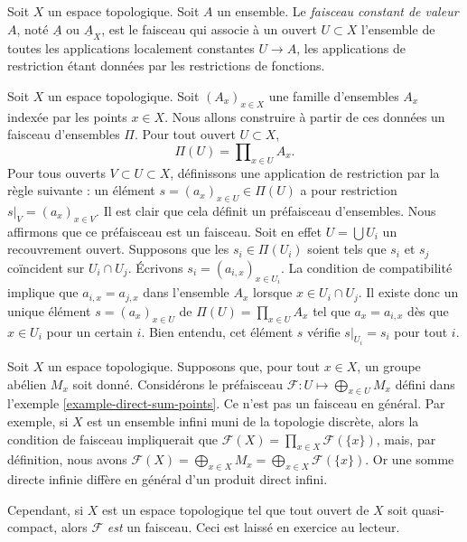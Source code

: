 \begin{definition}
\label{definition-constant-sheaf}
Soit $X$ un espace topologique. Soit $A$ un ensemble.
Le {\it faisceau constant de valeur $A$}, noté $\underline{A}$ ou
$\underline{A}_X$, est le faisceau qui associe à un ouvert $U \subset X$
l'ensemble de toutes les applications localement constantes $U \to A$, les applications
de restriction étant données par les restrictions de fonctions.
\end{definition}

\begin{example}
\label{example-sheaf-product-pointwise}
Soit $X$ un espace topologique. Soit $(A_x)_{x \in X}$
une famille d'ensembles $A_x$ indexée par les points $x \in X$. Nous
allons construire à partir de ces données un faisceau d'ensembles $\Pi$.
Pour tout ouvert $U \subset X$,
$$
\Pi(U) = \prod\nolimits_{x \in U} A_x.
$$
Pour tous ouverts $V \subset U \subset X$, définissons
une application de restriction par la règle suivante : un élément
$s = (a_x)_{x\in U} \in \Pi(U)$ a pour restriction
$s|_V = (a_x)_{x \in V}$. Il est clair que cela
définit un préfaisceau d'ensembles. Nous affirmons que ce préfaisceau est un faisceau.
Soit en effet $U = \bigcup U_i$ un recouvrement ouvert.
Supposons que les $s_i \in \Pi(U_i)$
soient tels que $s_i$ et $s_j$ coïncident sur $U_i \cap U_j$. Écrivons
$s_i = (a_{i, x})_{x\in U_i}$. La condition de compatibilité implique que
$a_{i, x} = a_{j, x}$ dans l'ensemble $A_x$ lorsque $x \in U_i \cap U_j$.
Il existe donc un unique élément $s = (a_x)_{x\in U}$
de $\Pi(U) = \prod_{x\in U} A_x$ tel que
$a_x = a_{i, x}$ dès que $x \in U_i$ pour un certain $i$. Bien entendu, cet
élément $s$ vérifie $s|_{U_i} = s_i$ pour tout $i$.
\end{example}

\begin{example}
\label{example-direct-sum-points-not-sheaf}
Soit $X$ un espace topologique.
Supposons que, pour tout $x\in X$, un groupe abélien $M_x$ soit donné.
Considérons le préfaisceau $\mathcal{F} : U \mapsto \bigoplus_{x \in U} M_x$
défini dans l'exemple \ref{example-direct-sum-points}. Ce
n'est pas un faisceau en général. Par exemple, si $X$ est un ensemble infini
muni de la topologie discrète, alors la condition de faisceau
impliquerait que $\mathcal{F}(X) = \prod_{x\in X} \mathcal{F}(\{x\})$,
mais, par définition, nous avons $\mathcal{F}(X)
= \bigoplus_{x \in X} M_x = \bigoplus_{x \in X} \mathcal{F}(\{x\})$.
Or une somme directe infinie diffère en général d'un
produit direct infini.

\medskip\noindent
Cependant, si $X$ est un espace topologique tel que tout ouvert
de $X$ soit quasi-compact, alors $\mathcal{F}$ {\it est} un faisceau.
Ceci est laissé en exercice au lecteur.
\end{example}

